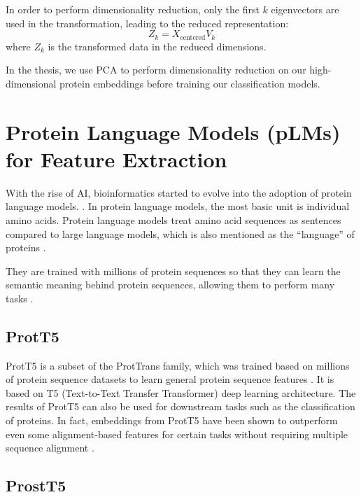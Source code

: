 {{In order to perform dimensionality reduction, only the first \( k \) eigenvectors are used in the transformation, leading to the reduced representation:
\begin{equation}
	Z_k = X_{\text{centered}} V_k
	\label{eq:dim_reduction}
\end{equation}
where \( Z_k \) is the transformed data in the reduced dimensions.


In the thesis, we use \gls{PCA}  to perform dimensionality reduction on our high-dimensional protein embeddings before training our classification models.


\section{Protein Language Models (pLMs) for Feature Extraction}

With the rise of AI, bioinformatics started to evolve into the adoption of protein language models. \cite{naveed2024llm, Arcas2022}.
In protein language models, the most basic unit is individual amino acids.
Protein language models treat amino acid sequences as sentences compared to large language models, which is also mentioned as the “language” of proteins \cite{ruffolo2024designing} \cite{elnaggar2021prottrans}.

They are trained with millions of protein sequences so that they can learn the semantic meaning behind protein sequences, allowing them to perform many tasks \cite{ruffolo2024designing}.

\subsection{ProtT5}

\gls{ProtT5} is a subset of the ProtTrans family, which was trained based on millions of protein sequence datasets to learn general protein sequence features \cite{elnaggar2021prottrans}.
It is based on T5 (Text-to-Text Transfer Transformer) deep learning architecture.
The results of \gls{ProtT5} can also be used for downstream tasks such as the classification of proteins.
In fact, embeddings from  \gls{ProtT5} have been shown to outperform even some alignment-based features for certain tasks without requiring multiple sequence alignment \cite{elnaggar2021prottrans}.

\subsection{ProstT5}

}}
